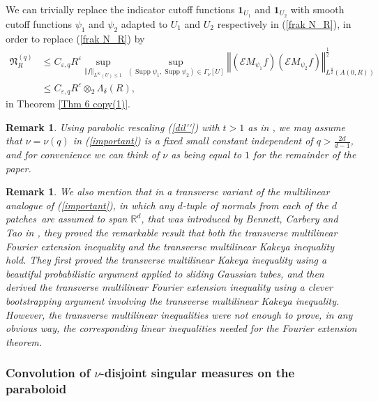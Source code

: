 \documentclass{amsart}%
\theoremstyle{plain}
\newtheorem{remark}[theorem]{Remark}
\numberwithin{equation}{section}
\begin{document}
We can trivially replace the indicator cutoff functions $\mathbf{1}_{U_{1}}$
and $\mathbf{1}_{U_{2}}$ with smooth cutoff functions $\psi_{1}$ and $\psi
_{2}$ adapted to $U_{1}$ and $U_{2}$ respectively in (\ref{frak N_R}), in
order to replace (\ref{frak N_R}) by
\begin{align}
\mathfrak{N}_{R}^{\left(  q\right)  }  & \leq C_{\varepsilon,q}R^{\varepsilon
}\sup_{\left\Vert f\right\Vert _{L^{\infty}\left(  U\right)  \leq1}}%
\sup_{\left(  \operatorname*{Supp}\psi_{1},\operatorname*{Supp}\psi
_{2}\right)  \in\Gamma_{\nu}\left[  U\right]  }\left\Vert \left(
\mathcal{E}M_{\psi_{1}}f\right)  \left(  \mathcal{E}M_{\psi_{2}}f\right)
\right\Vert _{L^{\frac{q}{2}}\left(  A\left(  0,R\right)  \right)  }^{\frac
{1}{2}}\label{important}\\
& \leq C_{\varepsilon,q}R^{\varepsilon}\otimes_{2}\Lambda_{\delta}\left(
R\right)  ,\nonumber
\end{align}
in Theorem \ref{Thm 6 copy(1)}.

\begin{remark}
\label{think}Using parabolic rescaling (\ref{dil''}) with $t>1$ as in
\cite{TaVaVe}, we may assume that $\nu=\nu\left(  q\right)  $ in
(\ref{important}) is a fixed small constant independent of $q>\frac{2d}{d-1}$,
and for convenience we can think of $\nu$ as being equal to $1$ for the
remainder of the paper.
\end{remark}

\begin{remark}
We also mention that in a \emph{transverse} variant of the multilinear
analogue of (\ref{important}), in which any $d$-tuple of normals from each of
the $d$ patches\ are assumed to span $\mathbb{R}^{d}$, that was introduced by
Bennett, Carbery and Tao in \cite{BeCaTa}, they proved the remarkable result
that both the \emph{transverse} multilinear Fourier extension inequality and
the \emph{transverse} multilinear Kakeya inequality hold. They first proved
the transverse multilinear Kakeya inequality using a beautiful probabilistic
argument applied to sliding Gaussian tubes, and then derived the transverse
multilinear Fourier extension inequality using a clever bootstrapping argument
involving the transverse multilinear Kakeya inequality. However, the
transverse multilinear inequalities were not enough to prove, in any obvious
way, the corresponding linear inequalities needed for the Fourier extension theorem.
\end{remark}

\subsubsection{Convolution of $\nu$-disjoint singular measures on the
paraboloid}
\end{document}
